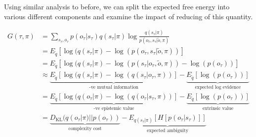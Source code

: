 \documentclass{article}
\newcommand{\KL}{\text{KL}}
\begin{document}
Using similar analysis to before, we can split the expected free energy into various different components and examine the impact of reducing of this quantity.

\begin{align}
    G(\tau,\pi) &= \sum_{s_\tau,o_\tau} p(o_\tau|s_\tau)  q(s_\tau|\pi) \log \frac{q(s_\tau|\pi)}{p(o_\tau,s_\tau|\tilde{o},\pi)}\\
            &= E_{\tilde{q}} \left[\log(q(s_\tau|\pi) - \log(p(o_\tau,s_\tau|\tilde{o},\pi))\right]\\
            &= E_{\tilde{q}} \left[\log(q(s_\tau|\pi) - \log(p(s_\tau|o_\tau,\tilde{o},\pi)) - \log(p(o_\tau))\right]\\
            &\approx \underbrace{E_{\tilde{q}} \left[ \log(q(s_\tau|\pi) - \log(q(s_\tau|o_\tau,\pi))\right]}_{\text{-ve mutual information}}  - \underbrace{E_{\tilde{q}}\left[\log(p(o_\tau)) \right]}_{\text{expected log evidence}}\\
            &= \underbrace{E_{\tilde{q}} \left[ \log(q(o_\tau|\pi) - \log(q(o_\tau|s_\tau,\pi))\right]}_\text{-ve epistemic value}  - \underbrace{E_{\tilde{q}}\left[\log(p(o_\tau)) \right]}_\text{extrinsic value}\\
            &= \underbrace{D_\KL(q(o_\tau|\pi)||p(o_\tau))}_\text{complexity cost} -
            \underbrace{E_{q(s_\tau|\pi)}\left[H[p(o_\tau|s_\tau)] \right]}_\text{expected ambiguity}\\
\end{align}
\end{document}
